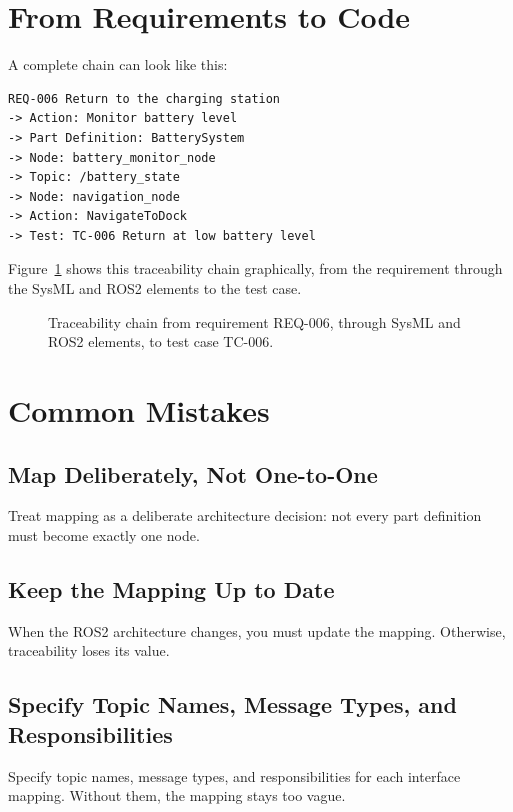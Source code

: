 \section{From Requirements to Code}
A complete chain can look like this:

\begin{lstlisting}[style=plaintext]
REQ-006 Return to the charging station
-> Action: Monitor battery level
-> Part Definition: BatterySystem
-> Node: battery_monitor_node
-> Topic: /battery_state
-> Node: navigation_node
-> Action: NavigateToDock
-> Test: TC-006 Return at low battery level
\end{lstlisting}

Figure~\ref{fig:kap16-traceability-batteriemanagement} shows this traceability chain graphically, from the requirement through the SysML and ROS2 elements to the test case.

\begin{figure}[H]
  \centering
  \caption{Traceability chain from requirement REQ-006, through SysML and ROS2 elements, to test case TC-006.}
  \label{fig:kap16-traceability-batteriemanagement}
\end{figure}

\section{Common Mistakes}
\subsection{Map Deliberately, Not One-to-One}
Treat mapping as a deliberate architecture decision: not every part definition must become exactly one node.

\subsection{Keep the Mapping Up to Date}
When the ROS2 architecture changes, you must update the mapping. Otherwise, traceability loses its value.

\subsection{Specify Topic Names, Message Types, and Responsibilities}
Specify topic names, message types, and responsibilities for each interface mapping. Without them, the mapping stays too vague.

